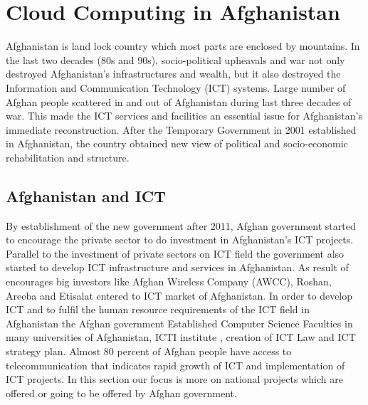 
\chapter{Cloud Computing in Afghanistan} %

\label{Chapter6} %


Afghanistan is land lock country which most parts are enclosed by mountains. In the last two decades (80s and 90s), socio-political upheavals and war not only destroyed Afghanistan’s infrastructures and wealth, but it also destroyed the Information and Communication Technology (ICT) systems. Large  number of Afghan people scattered in and out of Afghanistan during last three decades of war.  This made the ICT services and facilities an essential issue for Afghanistan’s immediate reconstruction. After the Temporary Government in 2001 established in Afghanistan, the country obtained new view of political and socio-economic rehabilitation and structure. 

\section{Afghanistan and ICT}
 
  By establishment of the new government after 2011, Afghan government started to encourage the private sector to do investment in Afghanistan's ICT projects. Parallel to the investment of private sectors on ICT field  the government also started to develop ICT infrastructure and services in Afghanistan. As result of encourages big investors like Afghan Wireless Company (AWCC), Roshan, Areeba and Etisalat entered to ICT market of Afghanistan. In order to develop ICT and to fulfil the human resource requirements of the ICT field in Afghanistan the Afghan government Established Computer Science Faculties in many universities of Afghanistan, ICTI institute , creation of ICT Law and ICT strategy plan. Almost 80 percent of Afghan people have access to telecommunication that indicates rapid growth of ICT and implementation of ICT projects. In this section our focus is more on national projects which are offered or going to be offered by Afghan government.\cite{afg1}\\

